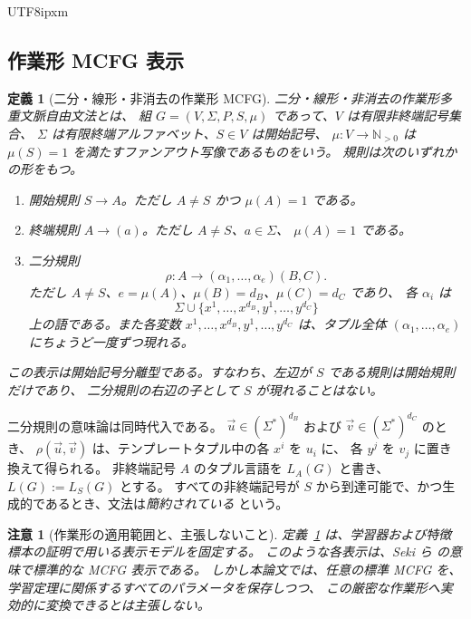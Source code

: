 \documentclass[10pt,a4paper]{article}
\newtheorem{definition}[theorem]{定義}
\newtheorem{remark}[theorem]{注意}
\theoremstyle{remark}
\newcommand{\tuple}[1]{\vec{#1}}
\begin{document}
\begin{CJK}{UTF8}{ipxm}
\subsection{作業形 MCFG 表示}

\begin{definition}[二分・線形・非消去の作業形 MCFG]
\label{def:working-mcfg}
\emph{二分・線形・非消去の作業形多重文脈自由文法}とは、
組 \(G=(V,\Sigma,P,S,\mu)\) であって、\(V\) は有限非終端記号集合、
\(\Sigma\) は有限終端アルファベット、\(S\in V\) は開始記号、
\(\mu\colon V\to\mathbb N_{>0}\) は \(\mu(S)=1\) を満たすファンアウト写像であるものをいう。
規則は次のいずれかの形をもつ。
\begin{enumerate}[label=(\roman*),leftmargin=*]
\item 開始規則 \(S\to A\)。ただし \(A\ne S\) かつ \(\mu(A)=1\) である。
\item 終端規則 \(A\to(a)\)。ただし \(A\ne S\)、\(a\in\Sigma\)、
\(\mu(A)=1\) である。
\item 二分規則
\[
  \rho\colon A\to(\alpha_1,\ldots,\alpha_e)(B,C).
\]
ただし \(A\ne S\)、\(e=\mu(A)\)、\(\mu(B)=d_B\)、\(\mu(C)=d_C\) であり、
各 \(\alpha_i\) は
\[
  \Sigma\cup\{x^1,\ldots,x^{d_B},y^1,\ldots,y^{d_C}\}
\]
上の語である。また各変数
\(x^1,\ldots,x^{d_B},y^1,\ldots,y^{d_C}\) は、タプル全体
\((\alpha_1,\ldots,\alpha_e)\) にちょうど一度ずつ現れる。
\end{enumerate}
この表示は\emph{開始記号分離型}である。すなわち、左辺が \(S\) である規則は開始規則だけであり、
二分規則の右辺の子として \(S\) が現れることはない。
\end{definition}

二分規則の意味論は同時代入である。
\(\tuple u\in(\Sigma^*)^{d_B}\) および \(\tuple v\in(\Sigma^*)^{d_C}\) のとき、
\(\rho(\tuple u,\tuple v)\) は、テンプレートタプル中の各 \(x^i\) を \(u_i\) に、
各 \(y^j\) を \(v_j\) に置き換えて得られる。
非終端記号 \(A\) のタプル言語を \(L_A(G)\) と書き、\(L(G):=L_S(G)\) とする。
すべての非終端記号が \(S\) から到達可能で、かつ生成的であるとき、文法は\emph{簡約されている}
という。

\begin{remark}[作業形の適用範囲と、主張しないこと]
\label{rem:working-form-scope}
定義~\ref{def:working-mcfg} は、学習器および特徴標本の証明で用いる表示モデルを固定する。
このような各表示は、Seki ら \cite{SekiEtAl1991} の意味で標準的な MCFG 表示である。
しかし本論文では、任意の標準 MCFG を、学習定理に関係するすべてのパラメータを保存しつつ、
この厳密な作業形へ実効的に変換できるとは主張しない。


\end{remark}
\end{CJK}
\end{document}

